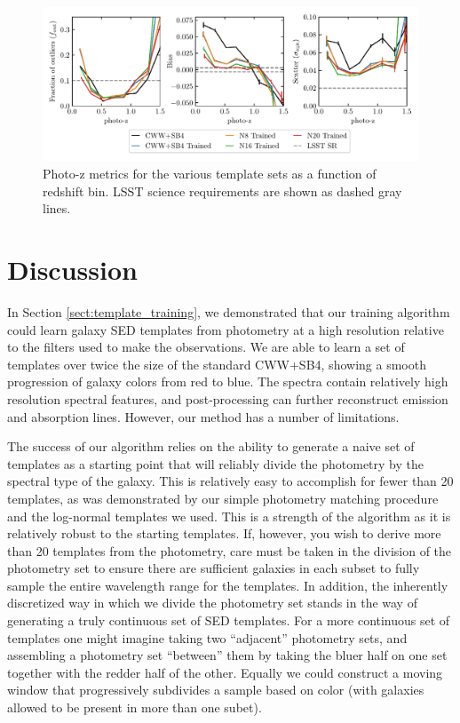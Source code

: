 \documentclass[twocolumn]{aastex63}
\begin{document}
    \begin{figure}
        \centering
        \includegraphics{photoz_binned_metrics.pdf}
        \caption{Photo-z metrics for the various template sets as a function of redshift bin. LSST science requirements are shown as dashed gray lines.}
        \label{fig:photoz_binned}
    \end{figure}

\section{Discussion}

    \label{sect:discussion}

    In Section \ref{sect:template_training}, we demonstrated that our training algorithm could learn galaxy SED templates from photometry at a high resolution relative to the filters used to make the observations.
    We are able to learn a set of templates over twice the size of the standard CWW+SB4, showing a smooth progression of galaxy colors from red to blue.
    The spectra contain relatively high resolution spectral features, and post-processing can further reconstruct emission and absorption lines.
    However, our method has a number of limitations.

    The success of our algorithm relies on the ability to generate a naive set of templates as a starting point that will reliably divide the photometry by the spectral type of the galaxy. 
    This is relatively easy to accomplish for fewer than 20 templates, as was demonstrated by our simple photometry matching procedure and the log-normal templates we used.
    This is a strength of the algorithm as it is relatively robust to the starting templates. If, however, you wish to derive more than 20 templates from the photometry, care must be taken in the division of the photometry set to ensure there are sufficient galaxies in each subset to fully sample the entire wavelength range for the templates.
    In addition, the inherently discretized way in which we divide the photometry set stands in the way of generating a truly continuous set of SED templates.
    For a more continuous set of templates one might imagine taking two ``adjacent'' photometry sets, and assembling a photometry set ``between'' them by taking the bluer half on one set together with the redder half of the other. 
    Equally we could construct a moving window that progressively subdivides a sample based on color (with galaxies allowed to be present in more than one subet).
\end{document}
